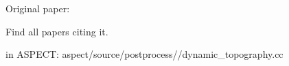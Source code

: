 Original paper: \cite{mizu86,zhgh93}

Find all papers citing it. 

\cite{zhmt08}

in ASPECT: aspect/source/postprocess//dynamic\_topography.cc
